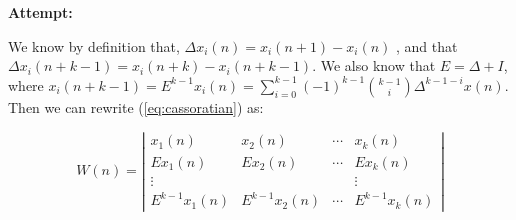 \documentclass[12pt,letterpaper]{article}
\theoremstyle{definition}
\begin{document}
\textbf{Attempt:}
\begin{changemargin}{.5cm}{0cm}

We know by definition that,  $\Delta x_i(n)=x_i(n+1)- x_i(n)$ , and that $\Delta x_i(n+k-1)=x_i(n+k)-x_i(n+k-1)$. We also know that $E= \Delta + I$, where $x_i(n+k-1) = E^{k-1}x_i(n) =\sum_{i=0}^{k-1} (-1)^{k-1} {k-1 \choose i} \Delta^{k-1-i}x(n)$. Then we can rewrite (\ref{eq:cassoratian}) as:

\begin{equation*}
    W(n) = \left|\begin{matrix}
        x_1(n) & x_2(n) &  \cdots & x_k(n) \\
        Ex_1(n) & Ex_2(n) & \cdots & Ex_k(n)\\
        \vdots & & & \vdots\\
        E^{k-1}x_1(n) & E^{k-1}x_2 (n) & \cdots & E^{k-1}x_k(n)
    \end{matrix}\right|
\end{equation*}


\end{changemargin}
\end{document}

